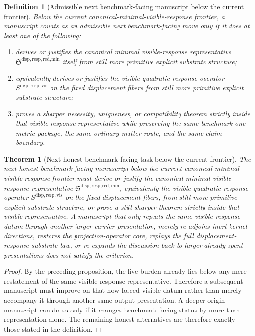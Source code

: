 \documentclass[11pt]{article}
\newcommand{\MinimalReducedStructure}{\mathfrak S^{\mathrm{disp,resp,red,min}}}
\newcommand{\VisibleResponseOperator}{S^{\mathrm{disp,resp,vis}}}
\newtheorem{definition}{Definition}
\newtheorem{theorem}{Theorem}
\begin{document}
\begin{definition}[Admissible next benchmark-facing manuscript below the current frontier]
Below the current canonical-minimal-visible-response frontier, a manuscript counts as an admissible next benchmark-facing move only if it does at least one of the following:
\begin{enumerate}
    \item derives or justifies the canonical minimal visible-response representative \(\MinimalReducedStructure\) itself from still more primitive explicit substrate structure;
    \item equivalently derives or justifies the visible quadratic response operator \(\VisibleResponseOperator\) on the fixed displacement fibers from still more primitive explicit substrate structure;
    \item proves a sharper necessity, uniqueness, or compatibility theorem strictly inside that visible-response representative while preserving the same benchmark one-metric package, the same ordinary matter route, and the same claim boundary.
\end{enumerate}
\end{definition}

\begin{theorem}[Next honest benchmark-facing task below the current frontier]
The next honest benchmark-facing manuscript below the current canonical-minimal-visible-response frontier must derive or justify the canonical minimal visible-response representative \(\MinimalReducedStructure\), equivalently the visible quadratic response operator \(\VisibleResponseOperator\) on the fixed displacement fibers, from still more primitive explicit substrate structure, or prove a still sharper theorem strictly inside that visible representative. A manuscript that only repeats the same visible-response datum through another larger carrier presentation, merely re-adjoins inert kernel directions, restores the projection-operator core, replays the full displacement-response substrate law, or re-expands the discussion back to larger already-spent presentations does not satisfy the criterion.
\end{theorem}

\begin{proof}
By the preceding proposition, the live burden already lies below any mere restatement of the same visible-response representative. Therefore a subsequent manuscript must improve on that now-forced visible datum rather than merely accompany it through another same-output presentation. A deeper-origin manuscript can do so only if it changes benchmark-facing status by more than representation alone. The remaining honest alternatives are therefore exactly those stated in the definition.
\end{proof}
\end{document}

